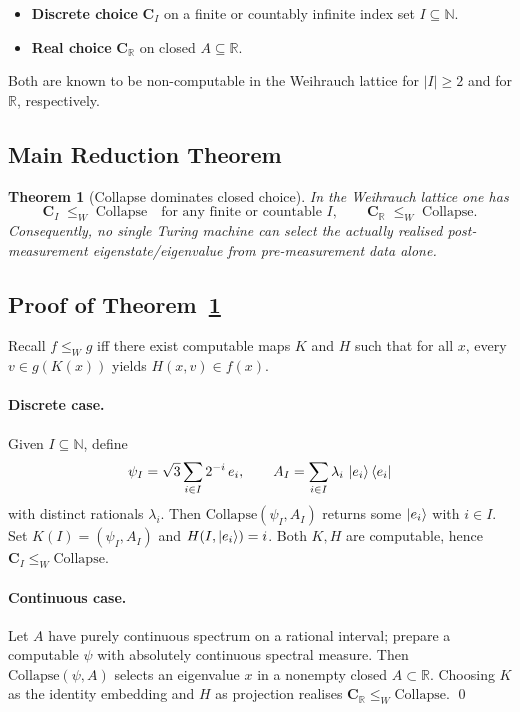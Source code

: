 \documentclass[12pt]{article}
\newcommand{\ketbra}[2]{\mathinner{|{#1}\rangle\,\langle{#2}|}}
\theoremstyle{definition}
\theoremstyle{plain}
\newtheorem{theorem}{Theorem}[section]
\begin{document}
\begin{itemize}[itemsep=2pt]
  \item \textbf{Discrete choice} $\mathbf{C}_I$ on a finite or countably infinite index set $I\subseteq\mathbb{N}$.
  \item \textbf{Real choice} $\mathbf{C}_{\mathbb{R}}$ on closed $A\subseteq\mathbb{R}$.
\end{itemize}

Both are known to be non-computable in the Weihrauch lattice for $|I|\ge 2$ and for $\mathbb{R}$, respectively.


\subsection{Main Reduction Theorem}
\label{subsec:main-choice-reduction}

\begin{theorem}[Collapse dominates closed choice]
\label{thm:collapse-choice}
In the Weihrauch lattice one has
\[
  \mathbf{C}_I \;\le_W\; \mathrm{Collapse} \quad\text{for any finite or countable } I,
  \qquad
  \mathbf{C}_{\mathbb{R}} \;\le_W\; \mathrm{Collapse}.
\]
Consequently, no single Turing machine can \emph{select} the actually realised post-measurement eigenstate/eigenvalue from pre-measurement data alone.
\end{theorem}

\subsection{Proof of Theorem~\ref{thm:collapse-choice}}
\label{subsec:proof-choice-reduction}

Recall $f\le_W g$ iff there exist computable maps $K$ and $H$ such that for all $x$, every $v\in g(K(x))$ yields $H(x,v)\in f(x)$.

\paragraph{Discrete case.} Given $I\subseteq\mathbb{N}$, define
\[
  \psi_I=\sqrt{3}\sum_{i\in I}2^{-i}\,e_i,\qquad
  A_I=\sum_{i\in I}\lambda_i\,\ketbra{e_i}{e_i}
\]
with distinct rationals $\lambda_i$. Then $\mathrm{Collapse}(\psi_I,A_I)$ returns some $\ket{e_i}$ with $i\in I$. Set $K(I)=(\psi_I,A_I)$ and $H(I,\ket{e_i})=i$. Both $K,H$ are computable, hence $\mathbf{C}_I\le_W\mathrm{Collapse}$.

\paragraph{Continuous case.} Let $A$ have purely continuous spectrum on a rational interval; prepare a computable $\psi$ with absolutely continuous spectral measure. Then $\mathrm{Collapse}(\psi,A)$ selects an eigenvalue $x$ in a nonempty closed $A\subset\mathbb{R}$. Choosing $K$ as the identity embedding and $H$ as projection realises $\mathbf{C}_{\mathbb{R}}\le_W\mathrm{Collapse}$.
\qed
\end{document}
